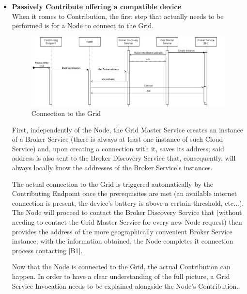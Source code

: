 \begin{itemize}
\begin{itemize}
    \end{itemize}

    \item \textbf{Passively Contribute offering a compatible device}\\
    When it comes to Contribution, the first step that actually needs to be performed is for a Node to connect to the Grid.
    \vspace{12mm}
    \begin{figure}[!ht]
        \centering
        \includegraphics[width=\linewidth]{document/chapters/chapter_6/images/use_cases_satisfaction_node_grid_connection.jpg}
        \caption{Connection to the Grid}
        \label{fig:use_cases_satisfaction_node_grid_connection}
    \end{figure}
    \vspace{5mm}

    First, independently of the Node, the Grid Master Service creates an instance of a Broker Service (there is always at least one instance of such Cloud Service) and, upon creating a connection with it, saves its address; said address is also sent to the Broker Discovery Service that, consequently, will always locally know the addresses of the Broker Service's instances.

    The actual connection to the Grid is triggered automatically by the Contributing Endpoint once the prerequisites are met (an available internet connection is present, the device's battery is above a certain threshold, etc...). The Node will proceed to contact the Broker Discovery Service that (without needing to contact the Grid Master Service for every new Node request) then provides the address of the more geographically convenient Broker Service instance; with the information obtained, the Node completes it connection process contacting [B1]. 

    Now that the Node is connected to the Grid, the actual Contribution can happen. In order to have a clear understanding of the full picture, a Grid Service Invocation needs to be explained alongside the Node's Contribution.
    \vspace{10mm}


\end{itemize}
